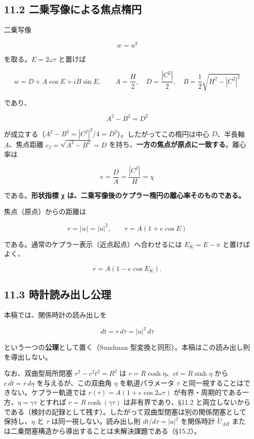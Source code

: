 \documentclass[
  a4paper,
]{ltjsarticle}
\begin{document}
\subsection{11.2
二乗写像による焦点楕円}\label{ux4e8cux4e57ux5199ux50cfux306bux3088ux308bux7126ux70b9ux6955ux5186}

二乗写像

\[
\boxed{w=u^2}
\]

を取る。\(E=2\omega\tau\) と置けば

\[
w=D+A\cos E+iB\sin E,
\qquad
A=\frac H2,\quad
D=\frac{|C^2|}2,\quad
B=\frac12\sqrt{H^2-|C^2|^2}
\]

であり、

\[
\boxed{A^2-B^2=D^2}
\]

が成立する（\(A^2-B^2=|C^2|^2/4=D^2\)）。したがってこの楕円は中心
\(D\)、半長軸 \(A\)、焦点距離 \(c_f=\sqrt{A^2-B^2}=D\)
を持ち、\textbf{一方の焦点が原点に一致する}。離心率は

\[
\boxed{
e=\frac DA=\frac{|C^2|}{H}=\chi
}
\]

である。\textbf{形状指標 χ
は、二乗写像後のケプラー楕円の離心率そのものである。}

焦点（原点）からの距離は

\[
\boxed{r=|w|=|u|^2},
\qquad
r=A(1+e\cos E)
\]

である。通常のケプラー表示（近点起点）へ合わせるには \(E_K=E-\pi\)
と置けばよく、

\[
r=A(1-e\cos E_K).
\]

\subsection{11.3
時計読み出し公理}\label{ux6642ux8a08ux8aadux307fux51faux3057ux516cux7406}

本稿では、関係時計の読み出しを

\[
\boxed{dt=r\,d\tau=|u|^2\,d\tau}
\]

という一つの\textbf{公理}として置く（Sundman
型変換と同形）。本稿はこの読み出し則を導出しない。

なお、双曲型局所閉塞 \(r^2-c^2t^2=R^2\) は
\(r=R\cosh\eta\)、\(ct=R\sinh\eta\) から \(c\,dt=r\,d\eta\)
を与えるが、この双曲角 \(\eta\) を軌道パラメータ \(\tau\)
と同一視することはできない。ケプラー軌道では
\(r(\tau)=A(1+e\cos2\omega\tau)\)
が有界・周期的である一方、\(\eta=\gamma\tau\) とすれば
\(r=R\cosh(\gamma\tau)\) は非有界であり、§11.2
と両立しないからである（検討の記録として残す）。したがって双曲型閉塞は別の関係閉塞として保持し、\(\eta\)
と \(\tau\) は同一視しない。読み出し則 \(dt/d\tau=|u|^2\) を関係時計
\(\tilde U_{AB}\)
または二乗閉塞構造から導出することは未解決課題である（§15.2）。
\end{document}
